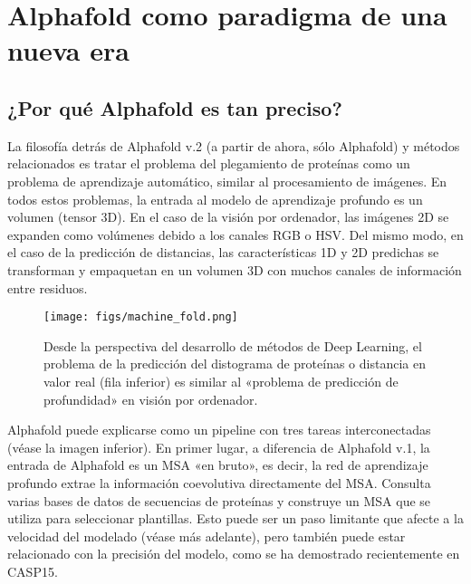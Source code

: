 \section{Alphafold como paradigma de una nueva era}
\subsection{¿Por qué Alphafold es tan preciso?}
La filosofía detrás de Alphafold v.2 (a partir de ahora, sólo Alphafold) y métodos relacionados es tratar el problema del plegamiento de proteínas como un problema de aprendizaje automático, similar al procesamiento de imágenes. En todos estos problemas, la entrada al modelo de aprendizaje profundo es un volumen (tensor 3D). En el caso de la visión por ordenador, las imágenes 2D se expanden como volúmenes debido a los canales RGB o HSV. Del mismo modo, en el caso de la predicción de distancias, las características 1D y 2D predichas se transforman y empaquetan en un volumen 3D con muchos canales de información entre residuos.

\begin{figure}[h]
\centering
\texttt{[image: figs/machine\_fold.png]}
\caption{Desde la perspectiva del desarrollo de métodos de Deep Learning, el problema de la predicción del distograma de proteínas o distancia en valor real (fila inferior) es similar al «problema de predicción de profundidad» en visión por ordenador.}
\end{figure}

Alphafold puede explicarse como un pipeline con tres tareas interconectadas (véase la imagen inferior). En primer lugar, a diferencia de Alphafold v.1, la entrada de Alphafold es un MSA «en bruto», es decir, la red de aprendizaje profundo extrae la información coevolutiva directamente del MSA. Consulta varias bases de datos de secuencias de proteínas y construye un MSA que se utiliza para seleccionar plantillas. Esto puede ser un paso limitante que afecte a la velocidad del modelado (véase más adelante), pero también puede estar relacionado con la precisión del modelo, como se ha demostrado recientemente en CASP15.

